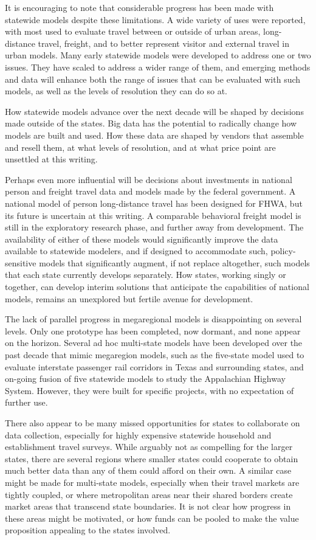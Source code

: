 It is encouraging to note that considerable progress has been made with statewide models despite these limitations. A wide variety of uses were reported, with most used to evaluate travel between or outside of urban areas, long-distance travel, freight, and to better represent visitor and external travel in urban models. Many early statewide models were developed to address one or two issues. They have scaled to address a wider range of them, and emerging methods and data will enhance both the range of issues that can be evaluated with such models, as well as the levels of resolution they can do so at.

How statewide models advance over the next decade will be shaped by decisions made outside of the states. Big data has the potential to radically change how models are built and used. How these data are shaped by vendors that assemble and resell them, at what levels of resolution, and at what price point are unsettled at this writing.

Perhaps even more influential will be decisions about investments in national person and freight travel data and models made by the federal government. A national model of person long-distance travel has been designed for FHWA, but its future is uncertain at this writing. A comparable behavioral freight model is still in the exploratory research phase, and further away from development. The availability of either of these models would significantly improve the data available to statewide modelers, and if designed to accommodate such, policy-sensitive models that significantly augment, if not replace altogether, such models that each state currently develops separately. How states, working singly or together, can develop interim solutions that anticipate the capabilities of national models, remains an unexplored but fertile avenue for development.

The lack of parallel progress in megaregional models is disappointing on several levels. Only one prototype has been completed, now dormant, and none appear on the horizon. Several ad hoc multi-state models have been developed over the past decade that mimic megaregion models, such as the five-state model used to evaluate interstate passenger rail corridors in Texas and surrounding states, and on-going fusion of five statewide models to study the Appalachian Highway System. However, they were built for specific projects, with no expectation of further use. 

There also
appear to be many missed opportunities for states to collaborate on data collection, especially for highly expensive statewide household and establishment travel surveys. While arguably not as compelling for the larger states, there are several regions where smaller states could cooperate to obtain much better data than any of them could afford on their own. A similar case might be made for multi-state models, especially when their travel markets are tightly coupled, or where metropolitan areas near their shared borders create market areas that transcend state boundaries. It is not clear how progress in these areas might be motivated, or how funds can be pooled to make the value proposition appealing to the states involved.

